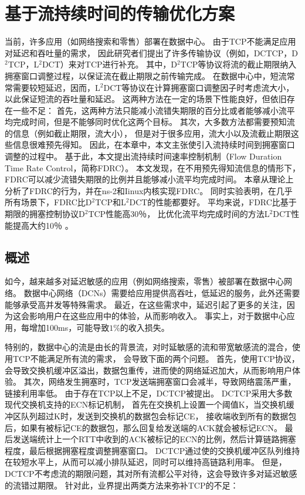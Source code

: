 \chapter{基于流持续时间的传输优化方案}
\label{chapter:FDRC}
当前，许多应用（如网络搜索和零售）部署在数据中心。
由于TCP不能满足应用对延迟和吞吐量的需求，
因此研究者们提出了许多传输协议（例如，DCTCP，D$^2$TCP，L$^2$DCT）来对TCP进行补充。
其中，D$^2$TCP等协议将流的截止期限纳入拥塞窗口调整过程，以保证流在截止期限之前传输完成。
在数据中心中，短流常常需要较短延迟，因而，L$^2$DCT等协议在计算拥塞窗口调整因子时考虑流大小，以此保证短流的吞吐量和延迟。
这两种方法在一定的场景下性能良好，但依旧存在一些不足：
首先，这两种方法只能减小流错失期限的百分比或者能够减小流平均完成时间，但是不能够同时优化这两个目标。
其次，大多数方法都需要预知流的信息（例如截止期限，流大小），
但是对于很多应用，流大小以及流截止期限这些信息很难预先得知。
因此，在本章中，本文主张使引入流持续时间到拥塞窗口调整的过程中。
基于此，本文提出流持续时间速率控制机制（Flow Duration Time Rate Control，简称FDRC）。
本文发现，在不用预先得知流信息的情形下，FDRC可以减少流错失期限的比例并且能够减小流平均完成时间。
本章从理论上分析了FDRC的行为，并在ns-2和Iinux内核实现FDRC。
同时实验表明，在几乎所有场景下，FDRC比D$^2$TCP和L$^2$DCT的性能都要好。
平均来说，FDRC比基于期限的拥塞控制协议D$^2$TCP性能高30％，
比优化流平均完成时间的方法L$^2$DCT性能提高大约10％ 。

\section{概述}
\label{FDRC:introduction}
如今，越来越多对延迟敏感的应用（例如网络搜索，零售）被部署在数据中心网络。
数据中心网络（DCNs）需要给应用提供高吞吐，低延迟的服务，此外还需要能够承受高并发等特殊需求。
最近，在这些需求中，延迟引起了更多的关注，因为这会影响用户在这些应用中的体验，从而影响收入。
事实上，对于数据中心应用，每增加100ms，可能导致$1\%$的收入损失\cite{DCTCP,LPD}。


特别的，数据中心的流是由长的背景流，对时延敏感的流和带宽敏感流的混合，使用TCP不能满足所有流的需求，
会导致下面的两个问题。
首先，使用TCP协议，会导致交换机缓冲区溢出，数据包重传，进而使的网络延迟加大，从而影响用户体验。
其次，网络发生拥塞时，TCP发送端拥塞窗口会减半，导致网络震荡严重，链接利用率低。
由于存在TCP以上不足，DCTCP\cite{DCTCP}被提出。 
DCTCP采用大多数现代交换机支持的ECN标记机制\cite{DCTCP}，
首先在交换机上设置一个阈值K，当交换机缓冲区队列超过K时，发送到交换机的数据包会标记CE，
接收端收到所有的数据包后，如果有被标记CE的数据包，那么回复给发送端的ACK就会被标记ECN。
最后发送端统计上一个RTT中收到的ACK被标记的ECN的比例，然后计算链路拥塞程度，最后根据拥塞程度调整拥塞窗口。
DCTCP通过使的交换机缓冲区队列维持在较短水平上，从而可以减小排队延迟，同时可以维持高链路利用率。
但是，DCTCP不考虑流的期限问题，其对所有流都公平对待，这会导致许多对延迟敏感的流错过期限\cite{D2TCP,D3}。
针对此，业界提出两类方法来弥补TCP的不足：

